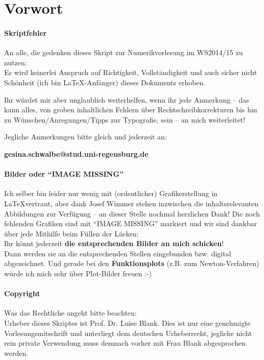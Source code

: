 %
%
%
%


\chapter*{Vorwort}
\subsubsection{Skriptfehler}
An alle, die gedenken dieses Skript zur Numerikvorlesung im WS2014/15 zu 
nutzen: \\
Es wird keinerlei Anspruch auf Richtigkeit, Vollständigkeit und auch sicher nicht Schönheit
(ich bin \LaTeX-Anfänger) dieses Dokuments erhoben.

Ihr würdet mir aber unglaublich weiterhelfen, wenn ihr jede Anmerkung 
-- das kann alles, von groben inhaltlichen 
Fehlern über Rechtschreibkorrekturen bis hin zu Wünschen/Anregungen/Tipps zur Typografie, sein --
an mich weiterleitet!

Jegliche Anmerkungen bitte gleich und jederzeit an:
\begin{center}
	\textbf{\large
		gesina.schwalbe@stud.uni-regensburg.de}
\end{center}
\hspace{1cm}


\subsubsection{Bilder oder \enquote{IMAGE MISSING}}
Ich selber bin leider nur wenig mit (ordentlicher) Grafikerstellung in \LaTeX vertraut,
aber dank Josef Wimmer stehen inzwischen die inhaltsrelevanten Abbildungen zur Verfügung
-- an dieser Stelle nochmal herzlichen Dank!
Die noch fehlenden Grafiken sind mit \enquote{IMAGE MISSING} markiert und
wir sind dankbar über jede Mithilfe beim Füllen der Lücken:\\
Ihr könnt jederzeit \textbf{die entsprechenden Bilder an mich schicken}!\\
Dann werden sie an die entsprechenden Stellen eingebunden
bzw. digital abgezeichnet.
Und gerade bei den \textbf{Funktionsplots} (z.B. zum Newton-Verfahren)
würde ich mich sehr über Plot-Bilder freuen :-)


\subsubsection{Copyright}
Was das Rechtliche angeht bitte beachten: \\
Urheber dieses Skriptes ist Prof. Dr. Luise Blank.
Dies ist nur eine genehmigte Vorlesungsmitschrift und unterliegt dem deutschen
Urheberrecht, jegliche nicht rein private Verwendung muss demnach vorher mit
Frau Blank abgesprochen werden.

